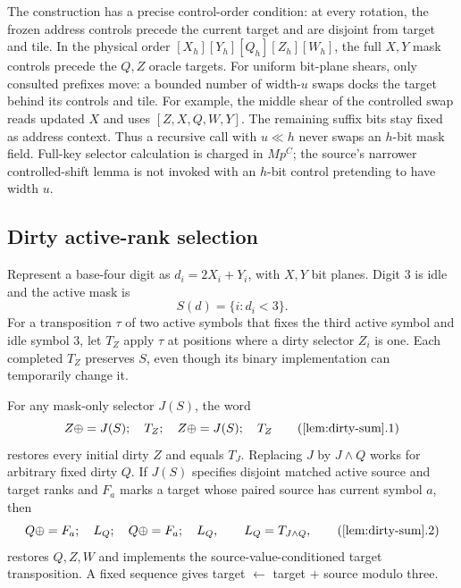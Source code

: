 The construction has a precise control-order condition: at every rotation, the frozen address controls precede the current target and are disjoint from target and tile. In the physical order $[X_h][Y_h][Q_h][Z_h][W_h]$, the full $X,Y$ mask controls precede the $Q,Z$ oracle targets. For uniform bit-plane shears, only consulted prefixes move: a bounded number of width-$u$ swaps docks the target behind its controls and tile. For example, the middle shear of the controlled swap reads updated $X$ and uses $[Z,X,Q,W,Y]$. The remaining suffix bits stay fixed as address context. Thus a recursive call with $u\ll h$ never swaps an $h$-bit mask field. Full-key selector calculation is charged in $Mp^C$; the source's narrower controlled-shift lemma is not invoked with an $h$-bit control pretending to have width $u$.

\subsection{Dirty active-rank selection}

Represent a base-four digit as $d_i=2X_i+Y_i$, with $X,Y$ bit planes. Digit $3$ is idle and the active mask is
\[
 S(d)=\{i:d_i<3\}.
\]
For a transposition $\tau$ of two active symbols that fixes the third active symbol and idle symbol $3$, let $T_Z$ apply $\tau$ at positions where a dirty selector $Z_i$ is one. Each completed $T_Z$ preserves $S$, even though its binary implementation can temporarily change it.

\begin{lemma}\label{lem:dirty-sum}
For any mask-only selector $J(S)$, the word
\[
 Z\mathbin\oplus=J(S);\quad T_Z;\quad Z\mathbin\oplus=J(S);\quad T_Z
 \tag{\ref{lem:dirty-sum}.1}
\]
restores every initial dirty $Z$ and equals $T_J$. Replacing $J$ by $J\land Q$ works for arbitrary fixed dirty $Q$. If $J(S)$ specifies disjoint matched active source and target ranks and $F_a$ marks a target whose paired source has current symbol $a$, then
\[
 Q\mathbin\oplus=F_a;\quad L_Q;\quad Q\mathbin\oplus=F_a;\quad L_Q,
 \qquad L_Q=T_{J\land Q},
 \tag{\ref{lem:dirty-sum}.2}
\]
restores $Q,Z,W$ and implements the source-value-conditioned target transposition. A fixed sequence gives target $\gets$ target $+$ source modulo three.
\end{lemma}

